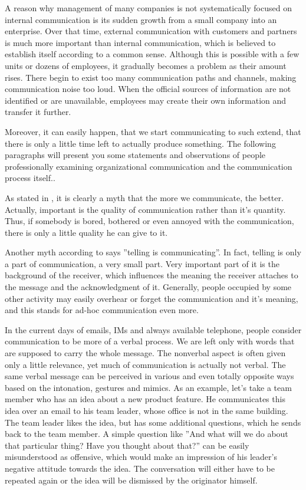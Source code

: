 \documentclass[11pt,singleside]{myfithesis2}
\begin{document}
A reason why management of many companies is not systematically focused on internal communication is its sudden growth from a small company into an enterprise. Over that time, external communication with customers and partners is much more important than internal communication, which is believed to establish itself according to a common sense. Although this is possible with a few units or dozens of employees, it gradually becomes a problem as their amount rises. There begin to exist too many communication paths and channels, making communication noise too loud. When the official sources of information are not identified or are unavailable, employees may create their own information and transfer it further.

Moreover, it can easily happen, that we start communicating to such extend, that there is only a little time left to actually produce something. The following paragraphs will present you some statements and observations of people professionally examining organizational communication and the communication process itself..

As stated in \cite{orgCommForSurvival}, it is clearly a myth that the more we communicate, the better. Actually, important is the quality of communication rather than it's quantity. Thus, if somebody is bored, bothered or even annoyed with the communication, there is only a little quality he can give to it.

Another myth according to \cite{orgCommForSurvival} says ''telling is communicating''. In fact, telling is only a part of communication, a very small part. Very important part of it is the background of the receiver, which influences the meaning the receiver attaches to the message and the acknowledgment of it. Generally, people occupied by some other activity may easily overhear or forget the communication and it's meaning, and this stands for ad-hoc communication even more.

In the current days of emails, IMs and always available telephone, people consider communication to be more of a verbal process. We are left only with words that are supposed to carry the whole message. The nonverbal aspect is often given only a little relevance, yet much of communication is actually not verbal. The same verbal message can be perceived in various and even totally opposite ways based on the intonation, gestures and mimics. As an example, let's take a team member who has an idea about a new product feature. He communicates this idea over an email to his team leader, whose office is not in the same building. The team leader likes the idea, but has some additional questions, which he sends back to the team member. A simple question like ''And what will we do about that particular thing? Have you thought about that?'' can be easily misunderstood as offensive, which would make an impression of his leader's negative attitude towards the idea. The conversation will either have to be repeated again or the idea will be dismissed by the originator himself.
\end{document}
